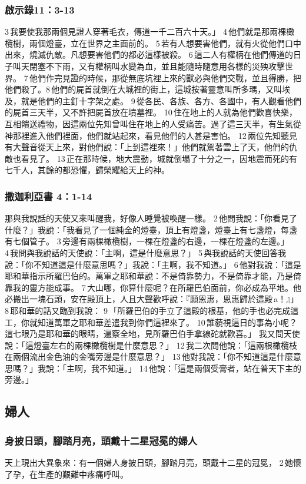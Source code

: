 \subsubsection{啟示錄11：3-13}
 3 我要使我那兩個見證人穿著毛衣，傳道一千二百六十天。」 4 他們就是那兩棵橄欖樹，兩個燈臺，立在世界之主面前的。 5 若有人想要害他們，就有火從他們口中出來，燒滅仇敵。凡想要害他們的都必這樣被殺。 6 這二人有權柄在他們傳道的日子叫天閉塞不下雨，又有權柄叫水變為血，並且能隨時隨意用各樣的災殃攻擊世界。 7 他們作完見證的時候，那從無底坑裡上來的獸必與他們交戰，並且得勝，把他們殺了。8 他們的屍首就倒在大城裡的街上，這城按著靈意叫所多瑪，又叫埃及，就是他們的主釘十字架之處。 9 從各民、各族、各方、各國中，有人觀看他們的屍首三天半，又不許把屍首放在墳墓裡。 10 住在地上的人就為他們歡喜快樂，互相饋送禮物，因這兩位先知曾叫住在地上的人受痛苦。過了這三天半，有生氣從神那裡進入他們裡面，他們就站起來，看見他們的人甚是害怕。 12 兩位先知聽見有大聲音從天上來，對他們說：「上到這裡來！」他們就駕著雲上了天，他們的仇敵也看見了。 13 正在那時候，地大震動，城就倒塌了十分之一，因地震而死的有七千人，其餘的都恐懼，歸榮耀給天上的神。

\subsubsection{撒迦利亞書 4：1-14}
那與我說話的天使又來叫醒我，好像人睡覺被喚醒一樣。 2 他問我說：「你看見了什麼？」我說：「我看見了一個純金的燈臺，頂上有燈盞，燈臺上有七盞燈，每盞有七個管子。 3 旁邊有兩棵橄欖樹，一棵在燈盞的右邊，一棵在燈盞的左邊。」 4 我問與我說話的天使說：「主啊，這是什麼意思？」 5 與我說話的天使回答我說：「你不知道這是什麼意思嗎？」我說：「主啊，我不知道。」 6 他對我說：「這是耶和華指示所羅巴伯的。萬軍之耶和華說：不是倚靠勢力，不是倚靠才能，乃是倚靠我的靈方能成事。 7 大山哪，你算什麼呢？在所羅巴伯面前，你必成為平地。他必搬出一塊石頭，安在殿頂上，人且大聲歡呼說：『願恩惠，恩惠歸於這殿 a！』」 8 耶和華的話又臨到我說： 9 「所羅巴伯的手立了這殿的根基，他的手也必完成這工，你就知道萬軍之耶和華差遣我到你們這裡來了。 10 誰藐視這日的事為小呢？這七眼乃是耶和華的眼睛，遍察全地，見所羅巴伯手拿線砣就歡喜。」
我又問天使說：「這燈臺左右的兩棵橄欖樹是什麼意思？」 12 我二次問他說：「這兩根橄欖枝在兩個流出金色油的金嘴旁邊是什麼意思？」 13 他對我說：「你不知道這是什麼意思嗎？」我說：「主啊，我不知道。」 14 他說：「這是兩個受膏者，站在普天下主的旁邊。」

\subsection{婦人}
\subsubsection{身披日頭，腳踏月亮，頭戴十二星冠冕的婦人}
天上現出大異象來：有一個婦人身披日頭，腳踏月亮，頭戴十二星的冠冕， 2 她懷了孕，在生產的艱難中疼痛呼叫。

